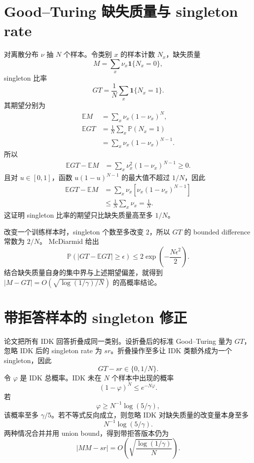 \documentclass[11pt]{article}
\numberwithin{equation}{section}
\newcommand{\E}{\mathbb{E}}
\newcommand{\Pp}{\mathbb{P}}
\newcommand{\1}{\mathbf{1}}
\begin{document}
\section{Good--Turing 缺失质量与 singleton rate}

对离散分布 $\nu$ 抽 $N$ 个样本。令类别 $x$ 的样本计数 $N_x$，缺失质量
\begin{equation}
 M=\sum_x\nu_x\1\{N_x=0\},
\end{equation}
singleton 比率
\begin{equation}
 GT=\frac1N\sum_x\1\{N_x=1\}.
\end{equation}
其期望分别为
\begin{align}
 \E M&=\sum_x\nu_x(1-\nu_x)^N,\\
 \E GT&=\frac1N\sum_x\Pp(N_x=1)\\
 &=\sum_x\nu_x(1-\nu_x)^{N-1}.
\end{align}
所以
\begin{align}
 \E GT-\E M
 &=\sum_x\nu_x^2(1-\nu_x)^{N-1}\ge0.
\end{align}
且对 $u\in[0,1]$，函数 $u(1-u)^{N-1}$ 的最大值不超过 $1/N$，因此
\begin{align}
 \E GT-\E M
 &=\sum_x\nu_x[\nu_x(1-\nu_x)^{N-1}]\\
 &\le\frac1N\sum_x\nu_x=\frac1N.
\end{align}
这证明 singleton 比率的期望只比缺失质量高至多 $1/N$。

改变一个训练样本时，singleton 个数至多改变 $2$，所以 $GT$ 的 bounded difference 常数为 $2/N$。
McDiarmid 给出
\begin{equation}
 \Pp(|GT-\E GT|\ge\epsilon)
 \le2\exp\left(-\frac{N\epsilon^2}{2}\right).
\end{equation}
结合缺失质量自身的集中界与上述期望偏差，就得到
$|M-GT|=O(\!\sqrt{\log(1/\gamma)/N})$ 的高概率结论。

\section{带拒答样本的 singleton 修正}

论文把所有 IDK 回答折叠成同一类别。设折叠后的标准 Good--Turing 量为 $GT$，
忽略 IDK 后的 singleton rate 为 $sr$。折叠操作至多让 IDK 类额外成为一个 singleton，因此
\begin{equation}
 GT-sr\in\{0,1/N\}.
\end{equation}
令 $\varphi$ 是 IDK 总概率。IDK 未在 $N$ 个样本中出现的概率
\begin{equation}
 (1-\varphi)^N\le e^{-N\varphi}.
\end{equation}
若
\begin{equation}
 \varphi\ge N^{-1}\log(5/\gamma),
\end{equation}
该概率至多 $\gamma/5$。若不等式反向成立，则忽略 IDK 对缺失质量的改变量本身至多
\begin{equation}
 N^{-1}\log(5/\gamma).
\end{equation}
两种情况合并并用 union bound，得到带拒答版本仍为
\begin{equation}
 |MM-sr|=O\left(\sqrt{\frac{\log(1/\gamma)}N}\right).
\end{equation}
\end{document}

